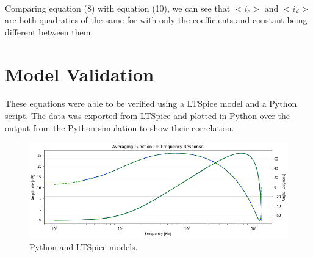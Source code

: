 \documentclass[10pt]{article}
\begin{document}
\paragraph{}
Comparing equation (8) with equation (10), we can see that \(<i_c>\) and \(<i_d>\) are both quadratics of the same for with only the coefficients and constant being different between them.

\section{Model Validation}
\paragraph{}
These equations were able to be verified using a LTSpice model and a Python script. The data was exported from LTSpice and plotted in Python over the output from the Python simulation to show their correlation.
\begin{figure}[!h]
    \centering
    \includegraphics[width=0.95\linewidth]{PythonValidation.png}
    \caption{Python and LTSpice models.}
    \label{PythonValidation}
\end{figure}
\end{document}
